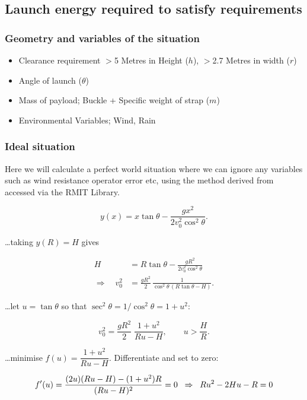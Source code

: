 \documentclass[a4paper,10pt]{article}
\begin{document}
\subsection{Launch energy required to satisfy requirements}

\subsubsection{Geometry and variables of the situation}

\begin{itemize}
    \item Clearance requirement $>$5 Metres in Height ($h$), $>$2.7 Metres in width ($r$)
    \item Angle of launch ($\theta$)
    \item Mass of payload; Buckle + Specific weight of strap ($m$)
    \item Environmental Variables; Wind, Rain
\end{itemize}

\subsubsection{Ideal situation}

Here we will calculate a perfect world situation where we can ignore any variables such as wind resistance operator error etc, using the method derived from \parencite{MunganCarlE.2017OtLo} accessed via the RMIT Library.

\[
y(x)=x\tan\theta-\frac{g x^{2}}{2 v_0^{2}\cos^{2}\theta}.
\]

\ldots taking \(y(R)=H\) gives

\begin{align}
H &= R\tan\theta-\frac{g R^{2}}{2 v_0^{2}\cos^{2}\theta}
\\
\Rightarrow\quad
v_0^{2} &= \frac{g R^{2}}{2}\,\frac{1}{\cos^{2}\theta\,(R\tan\theta-H)}.
\end{align}

\ldots let \(u=\tan\theta\) so that \(\sec^{2}\theta=1/\cos^{2}\theta=1+u^{2}\):

\begin{equation}
v_0^{2}=\frac{g R^{2}}{2}\;\frac{1+u^{2}}{R u - H}, \qquad u>\frac{H}{R}.
\end{equation}

\ldots minimise \(f(u)=\dfrac{1+u^{2}}{R u - H}\). Differentiate and set to zero:

\begin{equation}
    f'(u)=\frac{(2u)(Ru-H)-(1+u^{2})R}{(Ru-H)^{2}}=0
    \;\;\Rightarrow\;\; Ru^{2}-2Hu-R=0 \\
\end{equation}
\end{document}
